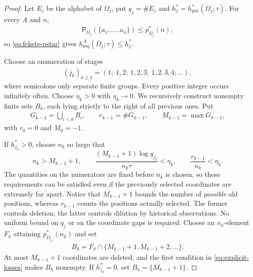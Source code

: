 \documentclass[11pt,reqno]{amsart}
\numberwithin{equation}{section}
\theoremstyle{definition}
\newcommand{\Patt}{\mathsf P}
\newcommand{\hseq}{h_{\mathrm{seq}}}
\newcommand{\hpat}{h_{\mathrm{pat}}^{*}}
\begin{document}
\begin{proof}
Let $E_j$ be the alphabet of $\Omega_j$, put $q_j=\#E_j$ and
$h_j^*=\hpat(\Omega_j;\tau)$.  For every $A$ and $n$,
\begin{align*}
 \Patt_{\Omega_j}(\{a_1,\ldots,a_n\})\le p_{\Omega_j}^*(n),
\end{align*}
so \eqref{eq:fekete-pstar} gives
$\hseq^A(\Omega_j;\tau)\le h_j^*$.

Choose an enumeration of stages
\begin{align*}
 (j_k)_{k\ge1}=(1;\ 1,2;\ 1,2,3;\ 1,2,3,4;\ldots),
\end{align*}
where semicolons only separate finite groups. Every positive integer
occurs infinitely often. Choose $\eta_k>0$ with $\eta_k\to0$.  We recursively
construct nonempty finite sets $B_k$, each lying strictly to the right of all
previous ones.  Put
\begin{align*}
 G_{k-1}=\bigcup_{i<k}B_i,
 \qquad r_{k-1}=\#G_{k-1},
 \qquad M_{k-1}=\max G_{k-1},
\end{align*}
with $r_0=0$ and $M_0=-1$.

If $h_{j_k}^*>0$, choose $n_k$ so large that
\begin{equation}\label{eq:explicit-losses}
 n_k>M_{k-1}+1,
 \qquad
 \frac{(M_{k-1}+1)\log q_{j_k}}{n_k\tau}<\eta_k,
 \qquad
 \frac{r_{k-1}}{n_k}<\eta_k.
\end{equation}
The quantities on the numerators are fixed before $n_k$ is chosen,
so these requirements can be satisfied even if the previously selected
coordinates are extremely far apart. Notice that $M_{k-1}+1$ bounds the
number of \emph{possible} old positions, whereas $r_{k-1}$ counts the
positions actually selected. The former controls deletion; the latter
controls dilution by historical observations. No uniform bound on $q_j$
or on the coordinate gaps is required. Choose an
$n_k$-element $F_k$ attaining $p_{\Omega_{j_k}}^*(n_k)$ and set
\begin{align*}
 B_k=F_k\cap\{M_{k-1}+1,M_{k-1}+2,\ldots\}.
\end{align*}
At most $M_{k-1}+1$ coordinates are deleted, and the first condition in
\eqref{eq:explicit-losses} makes $B_k$ nonempty.  If $h_{j_k}^*=0$, set
$B_k=\{M_{k-1}+1\}$.


\end{proof}
\end{document}
